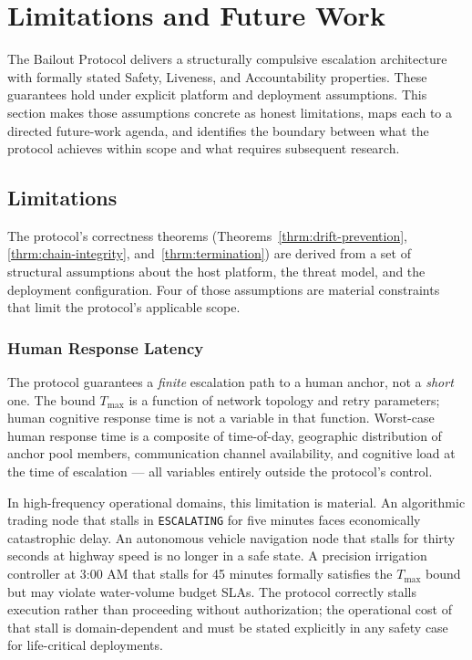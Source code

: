 \section{Limitations and Future Work}
\label{sec:limitations-and-future-work}

The Bailout Protocol delivers a structurally compulsive escalation architecture with formally stated Safety, Liveness, and Accountability properties. These guarantees hold under explicit platform and deployment assumptions. This section makes those assumptions concrete as honest limitations, maps each to a directed future-work agenda, and identifies the boundary between what the protocol achieves within scope and what requires subsequent research.

\subsection{Limitations}
\label{sec:limitations}

The protocol's correctness theorems (Theorems~\ref{thrm:drift-prevention}, \ref{thrm:chain-integrity}, and~\ref{thrm:termination}) are derived from a set of structural assumptions about the host platform, the threat model, and the deployment configuration. Four of those assumptions are material constraints that limit the protocol's applicable scope.

\subsubsection{Human Response Latency}
\label{sec:limitations-latency}

The protocol guarantees a \emph{finite} escalation path to a human anchor, not a \emph{short} one. The bound $T_{\max}$ is a function of network topology and retry parameters; human cognitive response time is not a variable in that function. Worst-case human response time is a composite of time-of-day, geographic distribution of anchor pool members, communication channel availability, and cognitive load at the time of escalation --- all variables entirely outside the protocol's control.

In high-frequency operational domains, this limitation is material. An algorithmic trading node that stalls in \texttt{ESCALATING} for five minutes faces economically catastrophic delay. An autonomous vehicle navigation node that stalls for thirty seconds at highway speed is no longer in a safe state. A precision irrigation controller at 3:00 AM that stalls for 45 minutes formally satisfies the $T_{\max}$ bound but may violate water-volume budget SLAs. The protocol correctly stalls execution rather than proceeding without authorization; the operational cost of that stall is domain-dependent and must be stated explicitly in any safety case for life-critical deployments.


